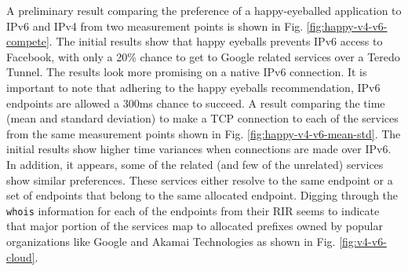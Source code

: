 A preliminary result comparing the preference of a happy-eyeballed application
to IPv6 and IPv4 from two measurement points is shown in Fig.
\ref{fig:happy-v4-v6-compete}. The initial results show that happy eyeballs
prevents IPv6 access to Facebook, with only a 20\% chance to get to Google
related services over a Teredo Tunnel. The results look more promising on a
native IPv6 connection. It is important to note that adhering to the happy
eyeballs recommendation, IPv6 endpoints are allowed a 300ms chance to succeed.
A result comparing the time (mean and standard deviation) to make a TCP
connection to each of the services from the same measurement points shown in
Fig. \ref{fig:happy-v4-v6-mean-std}. The initial results show higher time
variances when connections are made over IPv6. In addition, it appears, some
of the related (and few of the unrelated) services show similar preferences.
These services either resolve to the same endpoint or a set of endpoints that
belong to the same allocated endpoint. Digging through the \texttt{whois}
information for each of the endpoints from their \ac{RIR} seems to indicate
that major portion of the services map to allocated prefixes owned by popular
organizations like Google and Akamai Technologies as shown in Fig.
\ref{fig:v4-v6-cloud}.


